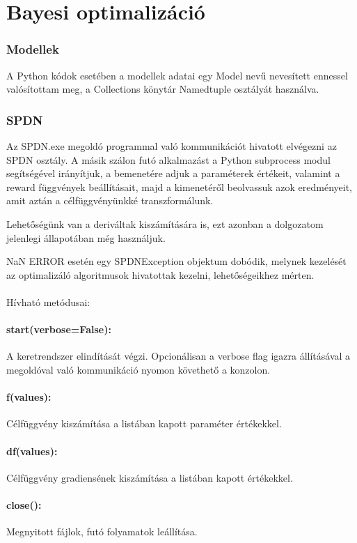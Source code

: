 \section{Bayesi optimalizáció}

\subsubsection{Modellek}
A Python kódok esetében a modellek adatai egy Model nevű nevesített ennessel valósítottam meg, a Collections könytár Namedtuple osztályát használva.

\subsubsection{SPDN}
Az SPDN.exe megoldó programmal való kommunikációt hivatott elvégezni az SPDN osztály. A másik szálon futó alkalmazást a Python subprocess modul segítségével irányítjuk, a bemenetére adjuk a paraméterek értékeit, valamint a reward függvények beállításait, majd a kimenetéről beolvassuk azok eredményeit, amit aztán a célfüggvényünkké transzformálunk.

Lehetőségünk van a deriváltak kiszámítására is, ezt azonban a dolgozatom jelenlegi állapotában még használjuk.

NaN ERROR esetén egy SPDNException objektum dobódik, melynek kezelését az optimalizáló algoritmusok hivatottak kezelni, lehetőségeikhez mérten.
\\\\Hívható metódusai:
\paragraph{start(verbose=False):} A keretrendszer elindítását végzi. Opcionálisan a verbose flag igazra állításával a megoldóval való kommunikáció nyomon követhető a konzolon.
\paragraph{f(values):} Célfüggvény kiszámítása a listában kapott paraméter értékekkel.
\paragraph{df(values):} Célfüggvény gradiensének kiszámítása a listában kapott értékekkel.
\paragraph{close():} Megnyitott fájlok, futó folyamatok leállítása.
